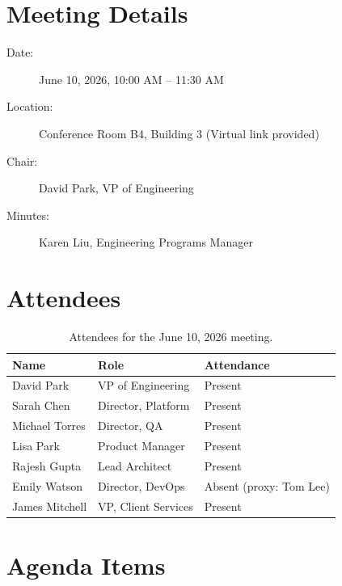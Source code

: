 \documentclass[
    language=english,
    doctype=memo,
    institution=none,
]{../../omnilatex}
\begin{document}
\maketitle

\section*{Meeting Details}

\begin{description}
    \item[Date:] June 10, 2026, 10:00 AM -- 11:30 AM
    \item[Location:] Conference Room B4, Building 3 (Virtual link provided)
    \item[Chair:] David Park, VP of Engineering
    \item[Minutes:] Karen Liu, Engineering Programs Manager
\end{description}

\section*{Attendees}

\begin{table}[h]
    \centering
    \begin{tabular}{lll}
        \toprule
        \textbf{Name} & \textbf{Role} & \textbf{Attendance} \\
        \midrule
        David Park       & VP of Engineering       & Present \\
        Sarah Chen       & Director, Platform      & Present \\
        Michael Torres   & Director, QA            & Present \\
        Lisa Park        & Product Manager         & Present \\
        Rajesh Gupta     & Lead Architect          & Present \\
        Emily Watson     & Director, DevOps        & Absent (proxy: Tom Lee) \\
        James Mitchell   & VP, Client Services     & Present \\
        \bottomrule
    \end{tabular}
    \caption{Attendees for the June 10, 2026 meeting.}
\end{table}

\section*{Agenda Items}
\end{document}
